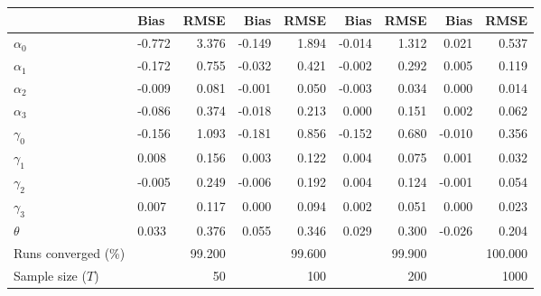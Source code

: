 
\begin{tabular}[t]{llrrrrrrr}
\toprule
  & Bias & RMSE & Bias & RMSE & Bias & RMSE & Bias & RMSE\\
\midrule
$\alpha_{0}$ & -0.772 & 3.376 & -0.149 & 1.894 & -0.014 & 1.312 & 0.021 & 0.537\\
$\alpha_{1}$ & -0.172 & 0.755 & -0.032 & 0.421 & -0.002 & 0.292 & 0.005 & 0.119\\
$\alpha_{2}$ & -0.009 & 0.081 & -0.001 & 0.050 & -0.003 & 0.034 & 0.000 & 0.014\\
$\alpha_{3}$ & -0.086 & 0.374 & -0.018 & 0.213 & 0.000 & 0.151 & 0.002 & 0.062\\
$\gamma_{0}$ & -0.156 & 1.093 & -0.181 & 0.856 & -0.152 & 0.680 & -0.010 & 0.356\\
$\gamma_{1}$ & 0.008 & 0.156 & 0.003 & 0.122 & 0.004 & 0.075 & 0.001 & 0.032\\
$\gamma_{2}$ & -0.005 & 0.249 & -0.006 & 0.192 & 0.004 & 0.124 & -0.001 & 0.054\\
$\gamma_{3}$ & 0.007 & 0.117 & 0.000 & 0.094 & 0.002 & 0.051 & 0.000 & 0.023\\
$\theta$ & 0.033 & 0.376 & 0.055 & 0.346 & 0.029 & 0.300 & -0.026 & 0.204\\
Runs converged (\%) &  & 99.200 &  & 99.600 &  & 99.900 &  & 100.000\\
Sample size ($T$) &  & 50 &  & 100 &  & 200 &  & 1000\\
\bottomrule
\end{tabular}

